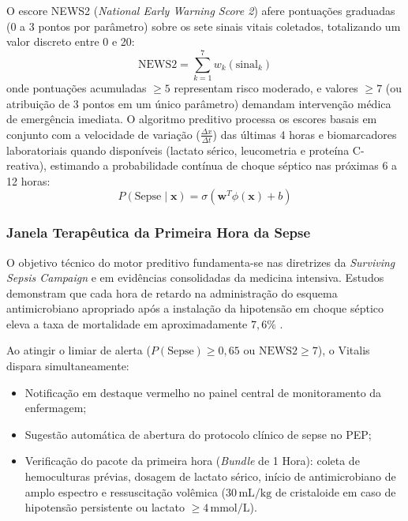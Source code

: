 O escore NEWS2 (\textit{National Early Warning Score 2}) afere pontuações graduadas (0 a 3 pontos por parâmetro) sobre os sete sinais vitais coletados, totalizando um valor discreto entre 0 e 20:
\begin{equation}
    \text{NEWS2} = \sum_{k=1}^7 w_k(\text{sinal}_k)
\end{equation}
onde pontuações acumuladas $\ge 5$ representam risco moderado, e valores $\ge 7$ (ou atribuição de 3 pontos em um único parâmetro) demandam intervenção médica de emergência imediata. O algoritmo preditivo processa os escores basais em conjunto com a velocidade de variação ($\frac{\Delta x}{\Delta t}$) das últimas 4 horas e biomarcadores laboratoriais quando disponíveis (lactato sérico, leucometria e proteína C-reativa), estimando a probabilidade contínua de choque séptico nas próximas 6 a 12 horas:
\begin{equation}
    P(\text{Sepse} \mid \mathbf{x}) = \sigma\left(\mathbf{w}^T \phi(\mathbf{x}) + b\right)
\end{equation}

\subsubsection{Janela Terapêutica da Primeira Hora da Sepse}
O objetivo técnico do motor preditivo fundamenta-se nas diretrizes da \textit{Surviving Sepsis Campaign} e em evidências consolidadas da medicina intensiva. Estudos demonstram que cada hora de retardo na administração do esquema antimicrobiano apropriado após a instalação da hipotensão em choque séptico eleva a taxa de mortalidade em aproximadamente $7{,}6\%$ \cite{kumar_sepsis:2006}.

Ao atingir o limiar de alerta ($P(\text{Sepse}) \ge 0{,}65$ ou $\text{NEWS2} \ge 7$), o Vitalis dispara simultaneamente:
\begin{itemize}[noitemsep]
    \item Notificação em destaque vermelho no painel central de monitoramento da enfermagem;
    \item Sugestão automática de abertura do protocolo clínico de sepse no PEP;
    \item Verificação do pacote da primeira hora (\textit{Bundle} de 1 Hora): coleta de hemoculturas prévias, dosagem de lactato sérico, início de antimicrobiano de amplo espectro e ressuscitação volêmica ($30\,\text{mL/kg}$ de cristaloide em caso de hipotensão persistente ou lactato $\ge 4\,\text{mmol/L}$).
\end{itemize}


